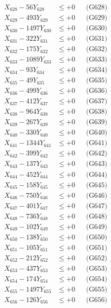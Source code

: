 \documentclass[a4paper,10pt]{article}
\begin{document}
{\begin{align}
X_{628} - 56Y_{628} &\leq +0 && \text{(G628)} \\
X_{629} - 493Y_{629} &\leq +0 && \text{(G629)} \\
X_{630} - 1497Y_{630} &\leq +0 && \text{(G630)} \\
\allowbreak
X_{631} - 322Y_{631} &\leq +0 && \text{(G631)} \\
X_{632} - 175Y_{632} &\leq +0 && \text{(G632)} \\
X_{633} - 1089Y_{633} &\leq +0 && \text{(G633)} \\
X_{634} - 93Y_{634} &\leq +0 && \text{(G634)} \\
X_{635} - 49Y_{635} &\leq +0 && \text{(G635)} \\
X_{636} - 499Y_{636} &\leq +0 && \text{(G636)} \\
X_{637} - 412Y_{637} &\leq +0 && \text{(G637)} \\
X_{638} - 964Y_{638} &\leq +0 && \text{(G638)} \\
X_{639} - 267Y_{639} &\leq +0 && \text{(G639)} \\
X_{640} - 330Y_{640} &\leq +0 && \text{(G640)} \\
\allowbreak
X_{641} - 1344Y_{641} &\leq +0 && \text{(G641)} \\
X_{642} - 399Y_{642} &\leq +0 && \text{(G642)} \\
X_{643} - 137Y_{643} &\leq +0 && \text{(G643)} \\
X_{644} - 452Y_{644} &\leq +0 && \text{(G644)} \\
X_{645} - 158Y_{645} &\leq +0 && \text{(G645)} \\
X_{646} - 750Y_{646} &\leq +0 && \text{(G646)} \\
X_{647} - 401Y_{647} &\leq +0 && \text{(G647)} \\
X_{648} - 736Y_{648} &\leq +0 && \text{(G648)} \\
X_{649} - 102Y_{649} &\leq +0 && \text{(G649)} \\
X_{650} - 138Y_{650} &\leq +0 && \text{(G650)} \\
\allowbreak
X_{651} - 105Y_{651} &\leq +0 && \text{(G651)} \\
X_{652} - 212Y_{652} &\leq +0 && \text{(G652)} \\
X_{653} - 437Y_{653} &\leq +0 && \text{(G653)} \\
X_{654} - 174Y_{654} &\leq +0 && \text{(G654)} \\
X_{655} - 1497Y_{655} &\leq +0 && \text{(G655)} \\
X_{656} - 126Y_{656} &\leq +0 && \text{(G656)} \\

\end{align}}
\end{document}
